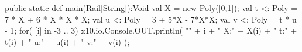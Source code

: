 %
%
%
%
%
%
%
%
%
%


\begin{xten}
  public static def main(Rail[String]):Void {
     val X = new Poly([0,1]);
     val t <: Poly = 7 * X + 6 * X * X * X; 
     val u <: Poly = 3 + 5*X - 7*X*X;
     val v <: Poly = t * u - 1;
     for( [i] in -3 .. 3) {
       x10.io.Console.OUT.println(
         "" + i + "	X:" + X(i) + "	t:" + t(i) 
         + "	u:" + u(i) + "	v:" + v(i)
         );
     }
  }

\end{xten}

